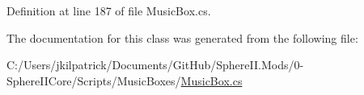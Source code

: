 Definition at line 187 of file Music\+Box.\+cs.



The documentation for this class was generated from the following file\+:\begin{DoxyCompactItemize}
\item 
C\+:/\+Users/jkilpatrick/\+Documents/\+Git\+Hub/\+Sphere\+I\+I.\+Mods/0-\/\+Sphere\+I\+I\+Core/\+Scripts/\+Music\+Boxes/\mbox{\hyperlink{_music_box_8cs}{Music\+Box.\+cs}}\end{DoxyCompactItemize}
